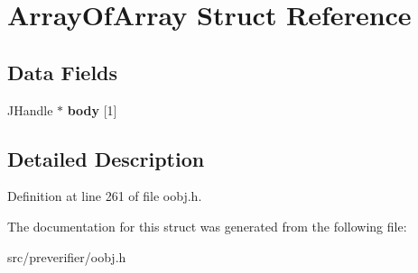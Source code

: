 \section{ArrayOfArray Struct Reference}
\label{struct_array_of_array}
\subsection*{Data Fields}
\begin{DoxyCompactItemize}
\item 
JHandle $\ast$ {\bfseries body} [1]\label{struct_array_of_array_a5804122e7e6a869b996be1c43e212f0f}

\end{DoxyCompactItemize}


\subsection{Detailed Description}


Definition at line 261 of file oobj.h.



The documentation for this struct was generated from the following file:\begin{DoxyCompactItemize}
\item 
src/preverifier/oobj.h\end{DoxyCompactItemize}
